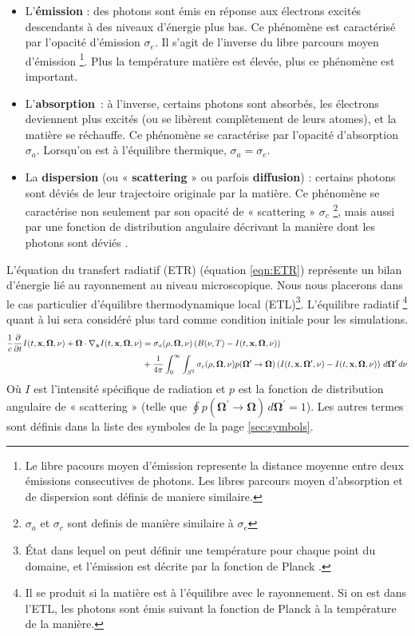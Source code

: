 \begin{itemize}
 \item L'\textbf{émission} : des photons sont émis en réponse aux électrons excités descendants à des niveaux d'énergie plus bas. Ce phénomène est caractérisé par l'opacité d'émission $\sigma_e$. Il s'agit de l'inverse du libre parcours moyen d'émission \footnote{Le libre pacours moyen d'émission represente la distance moyenne entre deux émissions consecutives de photons. Les libres parcours moyen d'absorption et de dispersion sont définis de maniere similaire.}. Plus la température matière est élevée, plus ce phénomène est important.
 \item L'\textbf{absorption} : à l'inverse, certains photons sont absorbés, les électrons deviennent plus excités (ou se libèrent complètement de leurs atomes), et la matière se réchauffe. Ce phénomène se caractérise par l'opacité d'absorption $\sigma_a$. Lorsqu'on est à l'équilibre thermique, $\sigma_a = \sigma_e$.
 \item La \textbf{dispersion} (ou « \textbf{scattering} » ou parfois \textbf{diffusion}) : certains photons sont déviés de leur trajectoire originale par la matière. Ce phénomène se caractérise non seulement par son opacité de « scattering » $\sigma_c$ \footnote{ $\sigma_a$ et $\sigma_c$ sont definis de manière similaire à $\sigma_e$}, mais aussi par une fonction de distribution angulaire décrivant la manière dont les photons sont déviés \parencite[13]{Reference3}.
\end{itemize}

L'équation du transfert radiatif (ETR) (équation \ref{eqn:ETR}) représente un bilan d'énergie lié au rayonnement au niveau microscopique. Nous nous placerons dans le cas particulier d'équilibre thermodynamique local (ETL)\footnote{État dans lequel on peut définir une température pour chaque point du domaine, et l'émission est décrite par la fonction de Planck \parencite{Reference3}.}. L'équilibre radiatif \footnote{Il se produit si la matière est à l'équilibre avec le rayonnement. Si on est dans l'ETL, les photons sont émis suivant la fonction de Planck à la température de la manière.} quant à lui sera considéré plus tard comme condition initiale pour les simulations.
\begingroup
\footnotesize
\begin{gather}
    \begin{aligned}
    \frac{1}{c} \frac{\partial}{\partial t}I(t,\mathbf{x},\bm{\Omega},\nu)+\bm{\Omega}\cdot\nabla_{\mathbf{x}} I(t,\mathbf{x},\bm{\Omega},\nu)
    &= \sigma_a(\rho,\bm{\Omega},\nu)\left(B(\nu,T)-I(t,\mathbf{x},\bm{\Omega},\nu)\right) \\
    &+ \frac{1}{4\pi} \int_{0}^{\infty} \int_{S^2}\sigma_c(\rho,\bm{\Omega},\nu)p(\bm{\Omega}^\prime\rightarrow\bm{\Omega})\left(I(t,\mathbf{x},\bm{\Omega}^\prime,\nu)-I(t,\mathbf{x},\bm{\Omega},\nu)\right) \, d\bm{\Omega}^\prime \, d\nu
    \end{aligned}
\label{eqn:ETR}
\end{gather}
\endgroup
Où $I$ est l'intensité spécifique de radiation et $p$ est la fonction de distribution angulaire de « scattering » (telle que $\oint p(\bm{\Omega}^\prime\rightarrow\bm{\Omega})\, d\bm{\Omega}^\prime=1$). Les autres termes sont définis dans la liste des symboles de la page \ref{sec:symbols}.

